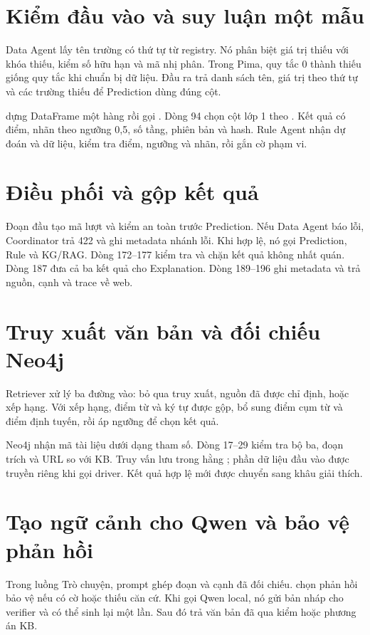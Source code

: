 \section{Kiểm đầu vào và suy luận một mẫu}
Data Agent lấy tên trường có thứ tự từ registry. Nó phân biệt giá trị thiếu với khóa thiếu, kiểm số hữu hạn và mã nhị phân. Trong Pima, quy tắc 0 thành thiếu giống quy tắc khi chuẩn bị dữ liệu. Đầu ra trả danh sách tên, giá trị theo thứ tự và các trường thiếu để Prediction dùng đúng cột.

 dựng DataFrame một hàng rồi gọi . Dòng 94 chọn cột lớp 1 theo . Kết quả có điểm, nhãn theo ngưỡng 0,5, số tầng, phiên bản và hash. Rule Agent nhận dự đoán và dữ liệu, kiểm tra điểm, ngưỡng và nhãn, rồi gắn cờ phạm vi.

\section{Điều phối và gộp kết quả}
Đoạn đầu tạo mã lượt và kiểm an toàn trước Prediction. Nếu Data Agent báo lỗi, Coordinator trả 422 và ghi metadata nhánh lỗi. Khi hợp lệ, nó gọi Prediction, Rule và KG/RAG. Dòng 172--177 kiểm tra và chặn kết quả không nhất quán. Dòng 187 đưa cả ba kết quả cho Explanation. Dòng 189--196 ghi metadata và trả nguồn, cạnh và trace về web.

\section{Truy xuất văn bản và đối chiếu Neo4j}
Retriever xử lý ba đường vào: bỏ qua truy xuất, nguồn đã được chỉ định, hoặc xếp hạng. Với xếp hạng, điểm từ và ký tự được gộp, bổ sung điểm cụm từ và điểm định tuyến, rồi áp ngưỡng để chọn kết quả.

Neo4j nhận mã tài liệu dưới dạng tham số. Dòng 17--29 kiểm tra bộ ba, đoạn trích và URL so với KB. Truy vấn lưu trong hằng ; phần dữ liệu đầu vào được truyền riêng khi gọi driver. Kết quả hợp lệ mới được chuyển sang khâu giải thích.

\section{Tạo ngữ cảnh cho Qwen và bảo vệ phản hồi}
Trong luồng Trò chuyện, prompt ghép đoạn và cạnh đã đối chiếu.  chọn phản hồi bảo vệ nếu có cờ hoặc thiếu căn cứ. Khi gọi Qwen local, nó gửi bản nháp cho verifier và có thể sinh lại một lần. Sau đó trả văn bản đã qua kiểm hoặc phương án KB.

